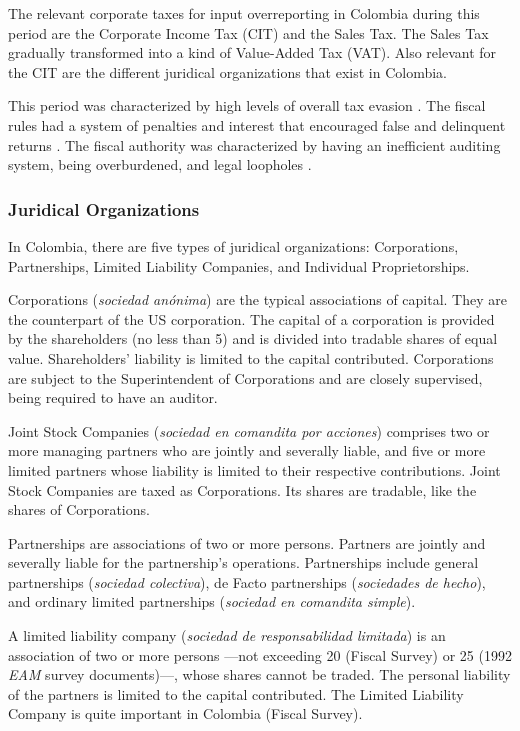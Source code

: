 \documentclass[
  12pt]{article}
\theoremstyle{definition}
\theoremstyle{remark}
\begin{document}
The relevant corporate taxes for input overreporting in Colombia during
this period are the Corporate Income Tax (CIT) and the Sales Tax. The
Sales Tax gradually transformed into a kind of Value-Added Tax (VAT).
Also relevant for the CIT are the different juridical organizations that
exist in Colombia.

This period was characterized by high levels of overall tax evasion
\citep{Sanchez1994}. The fiscal rules had a system of penalties and
interest that encouraged false and delinquent returns
\citep{McLure1989}. The fiscal authority was characterized by having an
inefficient auditing system, being overburdened, and legal loopholes
\citep{Perry1990}.

\subsubsection{Juridical Organizations}\label{juridical-organizations}

In Colombia, there are five types of juridical organizations:
Corporations, Partnerships, Limited Liability Companies, and Individual
Proprietorships.

Corporations (\emph{sociedad anónima}) are the typical associations of
capital. They are the counterpart of the US corporation. The capital of
a corporation is provided by the shareholders (no less than 5) and is
divided into tradable shares of equal value. Shareholders' liability is
limited to the capital contributed. Corporations are subject to the
Superintendent of Corporations and are closely supervised, being
required to have an auditor.

Joint Stock Companies (\emph{sociedad en comandita por acciones})
comprises two or more managing partners who are jointly and severally
liable, and five or more limited partners whose liability is limited to
their respective contributions. Joint Stock Companies are taxed as
Corporations. Its shares are tradable, like the shares of Corporations.

Partnerships are associations of two or more persons. Partners are
jointly and severally liable for the partnership's operations.
Partnerships include general partnerships (\emph{sociedad colectiva}),
de Facto partnerships (\emph{sociedades de hecho}), and ordinary limited
partnerships (\emph{sociedad en comandita simple}).

A limited liability company (\emph{sociedad de responsabilidad
limitada}) is an association of two or more persons ---not exceeding 20
(Fiscal Survey) or 25 (1992 \emph{EAM} survey documents)---, whose
shares cannot be traded. The personal liability of the partners is
limited to the capital contributed. The Limited Liability Company is
quite important in Colombia (Fiscal Survey).
\end{document}

